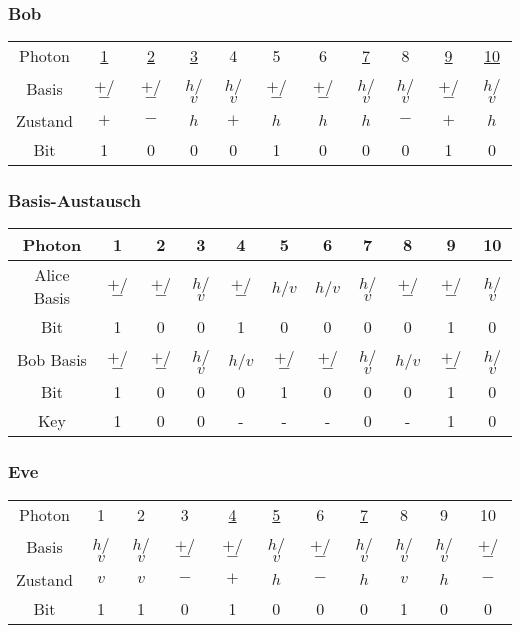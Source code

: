 \begin{frame}
	\frametitle{Bob}
	\small
	\begin{tabular}{c|c|c|c|c|c|c|c|c|c|c}
		Photon & \underline{1} & \underline{2} & \underline{3} & 4 & 5 & 6 & \underline{7} & 8 & \underline{9} &  \underline{10} \\
		Basis & $+$/$-$ & $+$/$-$ & $h$/$v$ & $h$/$v$ & $+$/$-$ & $+$/$-$ & $h$/$v$ & $h$/$v$ & $+$/$-$ & $h$/$v$ \\
		Zustand & $+$ & $-$ & $h$ & $+$ & $h$ & $h$ & $h$ & $-$ & $+$ & $h$\\
		Bit & 1 & 0 & 0 & 0 & 1 & 0 & 0 & 0 & 1 & 0 \\
	\end{tabular}
\end{frame}

\begin{frame}
	\frametitle{Basis-Austausch}
	\small
	\begin{tabular}{c|c|c|c|c|c|c|c|c|c|c}
		Photon & 1 & 2 & 3 & 4 & 5 & 6 & 7 & 8 & 9 & 10  \\
		\hline
		Alice Basis & \tiny $+$/$-$ & \tiny $+$/$-$ & \tiny $h$/$v$ & \tiny $+$/$-$ & \tiny $h$/$v$ & \tiny $h$/$v$ & \tiny $h$/$v$ & \tiny $+$/$-$ & \tiny $+$/$-$ & \tiny $h$/$v$ \\
		Bit & 1 & 0 & 0 & 1 & 0 & 0 & 0 & 0 & 1 & 0 \\
		\hline
		Bob Basis & \tiny $+$/$-$ & \tiny $+$/$-$ & \tiny $h$/$v$ & \tiny $h$/$v$ & \tiny $+$/$-$ & \tiny $+$/$-$ & \tiny $h$/$v$ & \tiny $h$/$v$ & \tiny $+$/$-$ & \tiny $h$/$v$ \\
		Bit & 1 & 0 & 0 & 0 & 1 & 0 & 0 & 0 & 1 & 0 \\
		\hline
		Key & 1 & 0 & 0 & - & - & - & 0 & - & 1 & 0 \\
	\end{tabular}
\end{frame}

\begin{frame}
	\frametitle{Eve}
	\small
	\begin{tabular}{c|c|c|c|c|c|c|c|c|c|c}
		Photon & 1 & 2 & 3 & \underline{4} & \underline{5} & 6 & \underline{7} & 8 & 9 & 10 \\
		Basis & $h$/$v$ & $h$/$v$ & $+$/$-$ & $+$/$-$ & $h$/$v$ & $+$/$-$ & $h$/$v$ & $h$/$v$ & $h$/$v$ & $+$/$-$ \\
		Zustand & $v$ & $v$ & $-$ & $+$ & $h$ & $-$ & $h$ & $v$ & $h$ & $-$\\
		Bit & 1 & 1 & 0 & 1 & 0 & 0 & 0 & 1 & 0 & 0 \\
	\end{tabular}
\end{frame}

